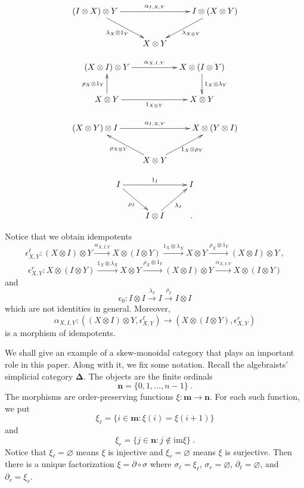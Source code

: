 \documentclass[a4paper,12pt,reqno]{amsart}
\theoremstyle{definition}
\theoremstyle{fact}
\theoremstyle{genquest}
\theoremstyle{step}
\newcommand{\lra}{\longrightarrow}
\begin{document}
\begin{equation}\label{leftunit}
\xymatrix{
(I\otimes X)\otimes Y \ar[rd]_{\lambda_{X} \otimes 1_Y}\ar[rr]^{\alpha_{I,X,Y}}   && I\otimes (X\otimes Y) \ar[ld]^{\lambda_{X\otimes Y}} \\
& X\otimes Y  &
}
\end{equation}

\begin{equation}\label{midunit}
\xymatrix{
(X\otimes I)\otimes Y \ar[rr]^-{\alpha_{X,I,Y}} && X\otimes (I\otimes Y) \ar[d]^-{1_X\otimes \lambda_Y} \\
X\otimes Y \ar[u]^-{\rho_X \otimes 1_Y} \ar[rr]_-{1_{X\otimes Y}} && X\otimes Y}
\end{equation}

\begin{equation}\label{rightunit}
\xymatrix{
(X\otimes Y)\otimes I \ar[rr]^{\alpha_{I,X,Y}}   && X\otimes (Y\otimes I)  \\
& X\otimes Y \ar[lu]^{\rho_{X \otimes Y}}  \ar[ru]_{1_X\otimes \rho_Y}&
}
\end{equation}

\begin{equation}\label{unitunit}
\xymatrix{
I \ar[rd]_{\rho_I}\ar[rr]^{1_I}   && I  \\
& I\otimes I \ar[ru]_{\lambda_I} & .
}
\end{equation}

Notice that we obtain idempotents
$$\epsilon^{\ell}_{X,Y} : (X\otimes I) \otimes Y \stackrel{\alpha_{X,I,Y}} \lra X\otimes (I \otimes Y)
\stackrel{1_X \otimes \lambda_X} \lra X\otimes Y
\stackrel{\rho_X \otimes 1_Y} \lra (X\otimes I)\otimes Y \ ,$$
$$\epsilon^{r}_{X,Y} : X\otimes (I \otimes Y) \stackrel{1_X \otimes \lambda_X} \lra X\otimes Y
\stackrel{\rho_X \otimes 1_Y} \lra (X\otimes I)\otimes Y \stackrel{\alpha_{X,I,Y}} \lra X\otimes (I \otimes Y)$$
and
$$\epsilon_0 : I\otimes I \stackrel{\lambda_I} \lra I \stackrel{\rho_I}\lra I\otimes I $$
which are not identities in general. Moreover, 
$$\alpha_{X,I,Y} : ((X\otimes I) \otimes Y, \epsilon^{\ell}_{X,Y}) \lra (X\otimes (I \otimes Y), \epsilon^{r}_{X,Y})$$
is a morphism of idempotents. 

We shall give an example of a skew-monoidal category that plays an important role in this paper.
Along with it, we fix some notation.
Recall the algebraists' simplicial category $\mathbf{\Delta}$.
The objects are the finite ordinals $$\mathbf{n} = \{0,1,\dots ,n-1\} \ .$$
The morphisms are order-preserving functions $\xi : \mathbf{m} \lra \mathbf{n}$. 
For each such function, we put
$$\xi_{\ell} = \{i\in \mathbf{m} : \xi (i) = \xi (i+1)\}$$
and
$$\xi_{r} = \{j \in \mathbf{n} : j \notin \mathrm{im} \xi \} \ .$$
Notice that $\xi_{\ell} =\varnothing$ means $\xi$ is injective and $\xi_{r} =\varnothing$ means $\xi$ is surjective. 
Then there is a unique factorization $\xi = \partial \circ \sigma$ where 
$\sigma_{\ell} = \xi_{\ell}$, $\sigma_{r} = \varnothing$, $\partial_{\ell} = \varnothing$, and $\partial_{r} = \xi_r$.  
\end{document}

